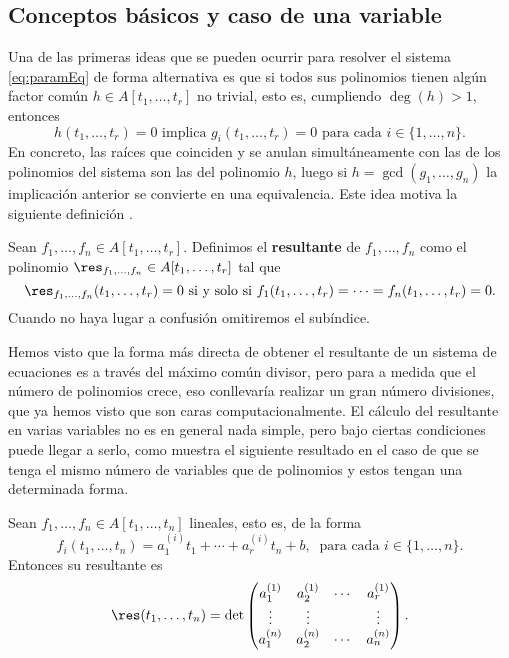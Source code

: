 \subsection{Conceptos básicos y caso de una variable}
Una de las primeras ideas que se pueden ocurrir para resolver el sistema \eqref{eq:paramEq} de forma alternativa es que si todos sus polinomios tienen algún factor común $h\in A[t_1,\dots, t_r]$ no trivial, esto es, cumpliendo $\deg(h)>1$, entonces
$$h(t_1,\dots, t_r) = 0 \text{ implica } g_i(t_1,\dots, t_r)=0 \text{ para cada } i\in\{1,\dots, n\}.$$
En concreto, las raíces que coinciden y se anulan simultáneamente con las de los polinomios del sistema son las del polinomio $h$, luego si $h = \gcd(g_1,\dots, g_n)$ la implicación anterior se convierte en una equivalencia. Este idea motiva la siguiente definición \cite{res3}.
\begin{definicion}\label{def:resultant}
    Sean $f_1,\dots , f_n \in A[t_1,\dots, t_r]$. Definimos el \textbf{resultante} de $f_1,\dots, f_n$ como el polinomio $\res_{f_1,\dots, f_n} \in A[t_1,\dots, t_r]$ tal que
    \begin{equation*}
        \res_{f_1,\dots, f_n}(t_1,\dots, t_r) = 0 \text{ si y solo si } f_1(t_1,\dots, t_r) = \cdots =  f_n(t_1,\dots, t_r) = 0.
    \end{equation*}
    Cuando no haya lugar a confusión omitiremos el subíndice.
\end{definicion}

Hemos visto que la forma más directa de obtener el resultante de un sistema de ecuaciones es a través del máximo común divisor, pero para a medida que el número de polinomios crece, eso conllevaría realizar un gran número divisiones, que ya hemos visto que son caras computacionalmente. El cálculo del resultante en varias variables no es en general nada simple, pero bajo ciertas condiciones puede llegar a serlo, como muestra el siguiente resultado en el caso de que se tenga el mismo número de variables que de polinomios y estos tengan una determinada forma.
\begin{teorema}\label{t:elimRes}
    Sean $f_1,\dots, f_n \in A[t_1,\dots, t_n]$ lineales, esto es, de la forma 
    $$f_i(t_1,\dots, t_n) = a_1^{(i)}t_1 + \cdots + a_r^{(i)}t_n + b,\ \text{ para cada } i\in \{1,\dots, n\}.$$
    Entonces su resultante es
    $$\res(t_1,\dots, t_n) = \det\begin{pmatrix}
        a_1^{(1)} & a_2^{(1)} & \cdots & a_r^{(1)} \\
        \vdots    & \vdots & &\vdots\\
        a_1^{(n)} & a_2^{(n)} & \cdots & a_n^{(n)}
    \end{pmatrix}.$$
\end{teorema}

